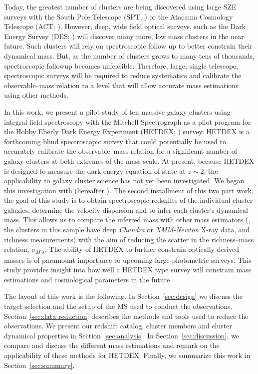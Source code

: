 Today, the greatest number of clusters are being discovered using large SZE surveys with the South Pole Telescope (SPT; \citealt{Carlstrom2011}) or the Atacama Cosmology Telescope (ACT; \citealt{Swetz2011}). However, deep, wide field optical surveys, such as the Dark Energy Survey (DES; \citealt{DES2005}) will discover many more, low mass clusters in the near future. Such clusters will rely on spectroscopic follow up to better constrain their dynamical mass. But, as the number of clusters grows to many tens of thousands, spectroscopic followup becomes unfeasible. Therefore, large, single telescope, spectroscopic surveys will be required to reduce systematics and calibrate the observable--mass relation to a level that will allow accurate mass estimations using other methods.

In this work, we present a pilot study of ten massive galaxy clusters using integral field spectroscopy with the Mitchell Spectrograph as a pilot program for the Hobby Eberly Dark Energy Experiment (HETDEX; \citealt{Hill2008}) survey. HETDEX is a forthcoming blind spectroscopic survey that could potentially be used to accurately calibrate the observable--mass relation for a significant number of galaxy clusters at both extremes of the mass scale. At present, because HETDEX is designed to measure the dark energy equation of state at $z\sim2$, the applicability to galaxy cluster science has not yet been investigated. We began this investigation with \cite{Boada2016} (hereafter ). The second installment of this two part work, the goal of this study is to obtain spectroscopic redshifts of the individual cluster galaxies, determine the velocity dispersion and to infer each cluster's dynamical mass. This allows us to compare the inferred mass with other mass estimators (\eg, the clusters in this sample have deep \textit{Chandra} or \textit{XMM-Newton} X-ray data, and richness measurements) with the aim of reducing the scatter in the richness--mass relation, $\sigma_{M|\lambda}$. The ability of HETDEX to further constrain optically derived masses is of paramount importance to upcoming large photometric surveys. This study provides insight into how well a HETDEX type survey will constrain mass estimations and cosmological parameters in the future.

The layout of this work is the following. In Section~\ref{sec:design} we discuss the target selection and the setup of the MS used to conduct the observations. Section~\ref{sec:data reduction} describes the methods and tools used to reduce the observations. We present our redshift catalog, cluster members and cluster dynamical properties in Section~\ref{sec:analysis}. In Section~\ref{sec:discussion}, we compare and discuss the different mass estimations and remark on the applicability of these methods for HETDEX. Finally, we summarize this work in Section~\ref{sec:summary}.

